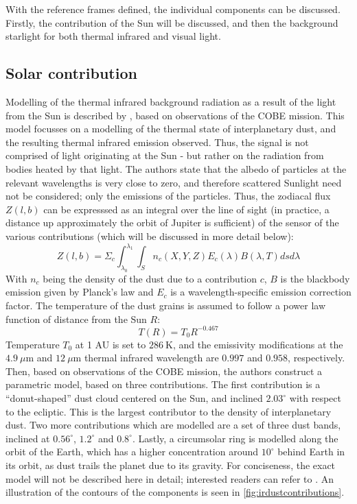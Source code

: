 With the reference frames defined, the individual components can be discussed. Firstly, the contribution of the Sun will be discussed, and then the background starlight for both thermal infrared and visual light.

\subsection{Solar contribution}
Modelling of the thermal infrared background radiation as a result of the light from the Sun is described by \cite{IRDust}, based on observations of the COBE mission. This model focusses on a modelling of the thermal state of interplanetary dust, and the resulting thermal infrared emission observed. Thus, the signal is not comprised of light originating at the Sun - but rather on the radiation from bodies heated by that light. The authors state that the albedo of particles at the relevant wavelengths is very close to zero, and therefore scattered Sunlight need not be considered; only the emissions of the particles. Thus, the zodiacal flux $Z(l, b)$ can be expresssed as an integral over the line of sight (in practice, a distance up approximately the orbit of Jupiter is sufficient) of the sensor of the various contributions (which will be discussed in  more detail below):
\begin{equation}
 Z(l, b) = \Sigma_c \int _{\lambda_0} ^{\lambda_1} \int _S n_{c}(X, Y, Z)  E_{c}(\lambda) B(\lambda, T) ds d\lambda
 \label{eq:irdustflux}
\end{equation}
With $n_c$ being the density of the dust due to a contribution $c$, $B$ is the blackbody emission given by Planck's law and $E_c$ is a wavelength-specific emission correction factor. The temperature of the dust grains is assumed to follow a power law function of distance from the Sun $R$:
\begin{equation}
 T(R) = T_0R^{-0.467}
\end{equation}
Temperature $T_0$ at 1 AU is set to $286~\mathrm{K}$, and the emissivity modifications at the $4.9 ~\mu\mathrm{m}$ and $12 ~\mu\mathrm{m}$ thermal infrared wavelength are $0.997$ and $0.958$, respectively. Then, based on observations of the COBE mission, the authors construct a parametric model, based on three contributions. The first contribution is a ``donut-shaped'' dust cloud centered on the Sun, and inclined $2.03^\circ$ with respect to the ecliptic. This is the largest contributor to the density of interplanetary dust. Two more contributions which are modelled are a set of three dust bands, inclined at $0.56^\circ$, $1.2^\circ$ and $0.8^\circ$. Lastly, a circumsolar ring is modelled along the orbit of the Earth, which has a higher concentration around $10^\circ$ behind Earth in its orbit, as dust trails the planet due to its gravity. For conciseness, the exact model will not be described here in detail; interested readers can refer to \cite{IRDust}. An illustration of the contours of the components is seen in \autoref{fig:irdustcontributions}.\\

